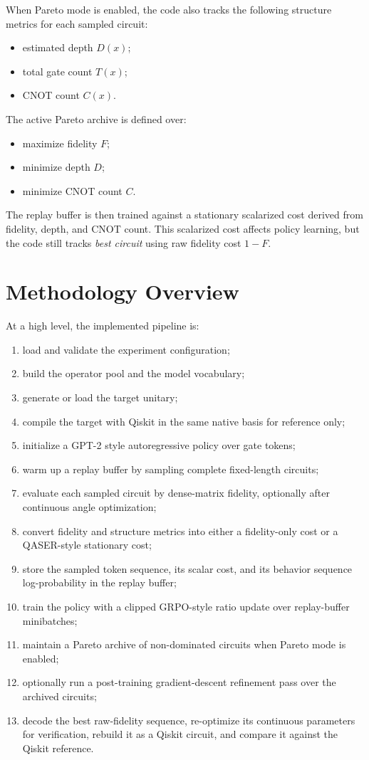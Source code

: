 \documentclass[11pt]{article}
\begin{document}
When Pareto mode is enabled, the code also tracks the following structure metrics for each sampled circuit:
\begin{itemize}[leftmargin=*]
\item estimated depth $D(x)$;
\item total gate count $T(x)$;
\item CNOT count $C(x)$.
\end{itemize}

The active Pareto archive is defined over:
\begin{itemize}[leftmargin=*]
\item maximize fidelity $F$;
\item minimize depth $D$;
\item minimize CNOT count $C$.
\end{itemize}

The replay buffer is then trained against a stationary scalarized cost derived from fidelity, depth, and CNOT count. This scalarized cost affects policy learning, but the code still tracks \emph{best circuit} using raw fidelity cost $1-F$.

\section{Methodology Overview}

At a high level, the implemented pipeline is:

\begin{enumerate}[leftmargin=*]
\item load and validate the experiment configuration;
\item build the operator pool and the model vocabulary;
\item generate or load the target unitary;
\item compile the target with Qiskit in the same native basis for reference only;
\item initialize a GPT-2 style autoregressive policy over gate tokens;
\item warm up a replay buffer by sampling complete fixed-length circuits;
\item evaluate each sampled circuit by dense-matrix fidelity, optionally after continuous angle optimization;
\item convert fidelity and structure metrics into either a fidelity-only cost or a QASER-style stationary cost;
\item store the sampled token sequence, its scalar cost, and its behavior sequence log-probability in the replay buffer;
\item train the policy with a clipped GRPO-style ratio update over replay-buffer minibatches;
\item maintain a Pareto archive of non-dominated circuits when Pareto mode is enabled;
\item optionally run a post-training gradient-descent refinement pass over the archived circuits;
\item decode the best raw-fidelity sequence, re-optimize its continuous parameters for verification, rebuild it as a Qiskit circuit, and compare it against the Qiskit reference.
\end{enumerate}
\end{document}
